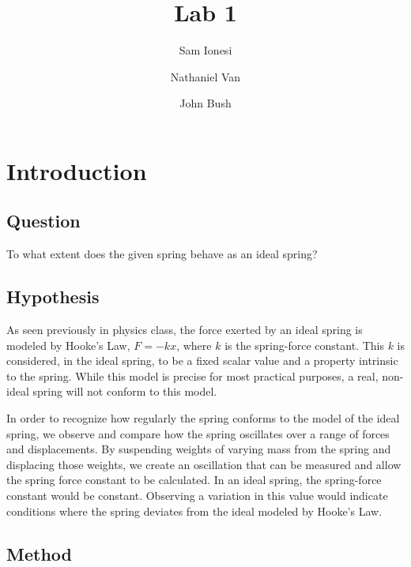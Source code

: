 \documentclass{article}
\author{Sam Ionesi \and Nathaniel Van \and John Bush}
\title{Lab 1}
\numberwithin{figure}{section}
\numberwithin{table}{section}
\begin{document}
 

\maketitle

\section{Introduction} 

\subsection{Question} 

To what extent does the given spring behave as an ideal spring?

\subsection{Hypothesis} 

As seen previously in physics class, the force exerted by an ideal spring is modeled by Hooke's Law, $F = -kx$, where $k$ is the spring-force constant. This $k$ is considered, in the ideal spring, to be a fixed scalar value and a property intrinsic to the spring.  While this model is precise for most practical purposes, a real, non-ideal spring will not conform to this model.

In order to recognize how regularly the spring conforms to the model of the ideal spring, we observe and compare how the spring oscillates over a range of forces and displacements.  By suspending weights of varying mass from the spring and displacing those weights, we create an oscillation that can be measured and allow the spring force constant to be calculated.  In an ideal spring, the spring-force constant would be constant.  Observing a variation in this value would indicate conditions where the spring deviates from the ideal modeled by Hooke's Law.

\subsection{Method} 
\end{document}
